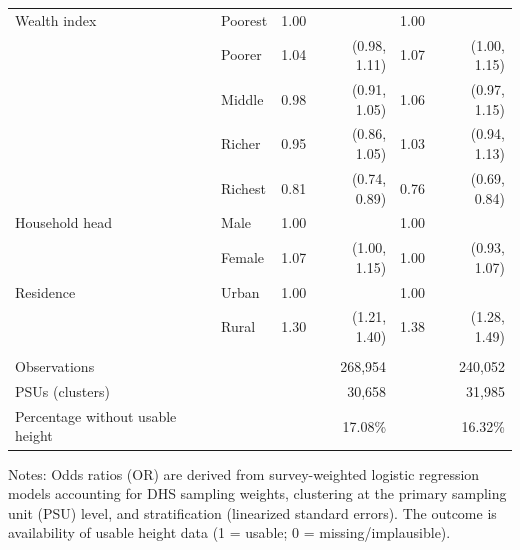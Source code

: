 \begin{table}[htbp]
\begin{threeparttable}
\begin{tabularx}{\textwidth}{>{\raggedright\arraybackslash}Xlrrrr}
Wealth index & Poorest & 1.00 &  & 1.00 &  \\
            & Poorer  & 1.04 & (0.98, 1.11) & 1.07 & (1.00, 1.15) \\
            & Middle  & 0.98 & (0.91, 1.05) & 1.06 & (0.97, 1.15) \\
            & Richer  & 0.95 & (0.86, 1.05) & 1.03 & (0.94, 1.13) \\
            & Richest & 0.81 & (0.74, 0.89) & 0.76 & (0.69, 0.84) \\

Household head & Male   & 1.00 &  & 1.00 &  \\
               & Female & 1.07 & (1.00, 1.15) & 1.00 & (0.93, 1.07) \\

Residence & Urban & 1.00 &  & 1.00 &  \\
          & Rural & 1.30 & (1.21, 1.40) & 1.38 & (1.28, 1.49) \\

\addlinespace[6pt]
\midrule
\multicolumn{6}{l}{\textbf{Model information}}\\
\addlinespace[2pt]
Observations &  & \multicolumn{2}{r}{268{,}954} & \multicolumn{2}{r}{240{,}052} \\
PSUs (clusters) &  & \multicolumn{2}{r}{30{,}658} & \multicolumn{2}{r}{31{,}985} \\
Percentage without usable height &  & \multicolumn{2}{r}{17.08\%} & \multicolumn{2}{r}{16.32\%} \\

\bottomrule
\end{tabularx}

\begin{tablenotes}[flushleft]
\footnotesize
\item Notes: Odds ratios (OR) are derived from survey-weighted logistic regression models accounting for DHS sampling weights, clustering at the primary sampling unit (PSU) level, and stratification (linearized standard errors). The outcome is availability of usable height data (1 = usable; 0 = missing/implausible).
\end{tablenotes}

\end{threeparttable}
\end{table}